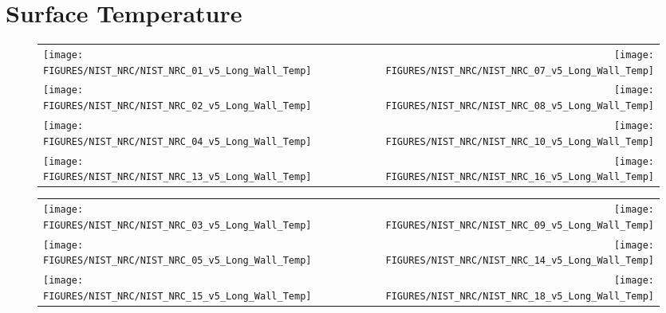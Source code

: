 \chapter{Surface Temperature}



\begin{figure}[h!]
\begin{tabular*}{\textwidth}{l@{\extracolsep{\fill}}r}
\texttt{[image: FIGURES/NIST\_NRC/NIST\_NRC\_01\_v5\_Long\_Wall\_Temp]} &
\texttt{[image: FIGURES/NIST\_NRC/NIST\_NRC\_07\_v5\_Long\_Wall\_Temp]} \\
\texttt{[image: FIGURES/NIST\_NRC/NIST\_NRC\_02\_v5\_Long\_Wall\_Temp]} &
\texttt{[image: FIGURES/NIST\_NRC/NIST\_NRC\_08\_v5\_Long\_Wall\_Temp]} \\
\texttt{[image: FIGURES/NIST\_NRC/NIST\_NRC\_04\_v5\_Long\_Wall\_Temp]} &
\texttt{[image: FIGURES/NIST\_NRC/NIST\_NRC\_10\_v5\_Long\_Wall\_Temp]} \\
\texttt{[image: FIGURES/NIST\_NRC/NIST\_NRC\_13\_v5\_Long\_Wall\_Temp]} &
\texttt{[image: FIGURES/NIST\_NRC/NIST\_NRC\_16\_v5\_Long\_Wall\_Temp]}
\end{tabular*}
\label{NIST_NRC_Long_Wall_Temp_Closed}
\end{figure}

\begin{figure}[h!]
\begin{tabular*}{\textwidth}{l@{\extracolsep{\fill}}r}
\texttt{[image: FIGURES/NIST\_NRC/NIST\_NRC\_03\_v5\_Long\_Wall\_Temp]} &
\texttt{[image: FIGURES/NIST\_NRC/NIST\_NRC\_09\_v5\_Long\_Wall\_Temp]} \\
\texttt{[image: FIGURES/NIST\_NRC/NIST\_NRC\_05\_v5\_Long\_Wall\_Temp]} &
\texttt{[image: FIGURES/NIST\_NRC/NIST\_NRC\_14\_v5\_Long\_Wall\_Temp]} \\
\texttt{[image: FIGURES/NIST\_NRC/NIST\_NRC\_15\_v5\_Long\_Wall\_Temp]} &
\texttt{[image: FIGURES/NIST\_NRC/NIST\_NRC\_18\_v5\_Long\_Wall\_Temp]}
\end{tabular*}
\label{NIST_NRC_Long_Wall_Temp_Open}
\end{figure}

\clearpage


